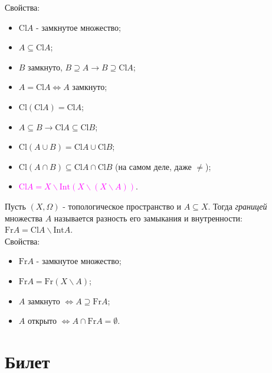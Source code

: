 \documentclass[a4paper,100pt]{article}
\theoremstyle{indented}
\begin{document}
Свойства:
\begin{itemize}
    
    \item $\text{Cl}A$ - замкнутое множество;
    \item $A\subseteq \text{Cl}A$;
    \item $B$ замкнуто, $B\supseteq A \rightarrow B \supseteq \text{Cl}A$;
    \item $A = \text{Cl}A \Leftrightarrow A$ замкнуто;
    \item $\text{Cl}(\text{Cl}A)=\text{Cl}A$;
    \item $A\subseteq B \rightarrow \text{Cl}A\subseteq \text{Cl}B$;
    \item $\text{Cl}(A\cup B)=\text{Cl}A\cup \text{Cl}B$;
    \item $\text{Cl}(A\cap B)\subseteq \text{Cl}A\cap\text{Cl}B $ (на самом деле, даже $\neq$);
    \item \textcolor{magenta}{$\text{Cl}A=X\backslash \text{Int}(X\backslash(X\backslash A))$}.

\end{itemize}

Пусть $(X, \Omega)$ - топологическое пространство и $A\subseteq X$. Тогда \textit{границей} \hypertarget{n9}{множества} $A$ называется разность его замыкания и внутренности: $\text{Fr}A = \text{Cl}A\backslash \text{Int}A$. \\

Свойства:
\begin{itemize}

    \item $\text{Fr} A$ - замкнутое множество;
    \item $\text{Fr} A = \text{Fr}(X\backslash A)$;
    \item $A$ замкнуто $\Leftrightarrow A \supseteq \text{Fr} A$;
    \item $A$ открыто $\Leftrightarrow A \cap \text{Fr} A = \emptyset$.

\end{itemize}

\section{Билет} \

\medskip
\end{document}

